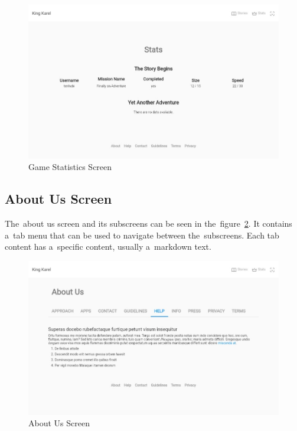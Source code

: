 \begin{figure}
    \centering
    \includegraphics[width=1\linewidth]{assets/implementation/ui/kingkarel_stats.jpeg}
    \caption{Game Statistics Screen}
    \label{fig:implementation:ui:stats}
\end{figure}

\subsection{About Us Screen}

The~about us screen and its subscreens can be seen in the~figure~\ref{fig:implementation:ui:aboutus}.
It contains a~tab menu that can be used to navigate between the~subscreens.
Each tab content has a~specific content, usually a~markdown text.

\begin{figure}
    \centering
    \includegraphics[width=1\linewidth]{assets/implementation/ui/kingkarel_aboutus.jpeg}
    \caption{About Us Screen}
    \label{fig:implementation:ui:aboutus}
\end{figure}
